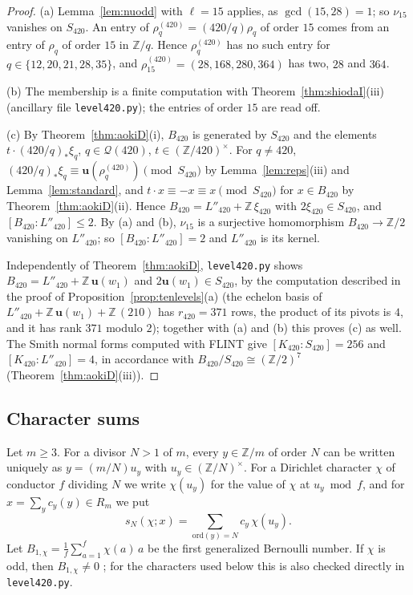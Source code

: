 \documentclass[11pt]{amsart}
\theoremstyle{definition}
\theoremstyle{remark}
\numberwithin{equation}{section}
\newcommand{\Z}{\mathbb{Z}}
\newcommand{\cQ}{\mathcal{Q}}
\newcommand{\uu}{\mathbf{u}}
\begin{document}
\begin{proof}
(a) Lemma~\ref{lem:nuodd} with $\ell=15$ applies, as $\gcd(15,28)=1$; so $\nu_{15}$ vanishes on $S_{420}$. An entry of $\rho^{(420)}_q=(420/q)\rho_q$ of order $15$ comes from an entry of $\rho_q$ of order $15$ in $\Z/q$. Hence $\rho^{(420)}_q$ has no such entry for $q\in\{12,20,21,28,35\}$, and $\rho^{(420)}_{15}=(28,168,280,364)$ has two, $28$ and $364$.

(b) The membership is a finite computation with Theorem~\ref{thm:shiodaI}(iii) (ancillary file \texttt{level420.py}); the entries of order $15$ are read off.

(c) By Theorem~\ref{thm:aokiD}(i), $B_{420}$ is generated by $S_{420}$ and the elements $t\cdot(420/q)_*\xi_q$, $q\in\cQ(420)$, $t\in(\Z/420)^\times$. For $q\ne420$, $(420/q)_*\xi_q\equiv\uu(\rho^{(420)}_q)\pmod{S_{420}}$ by Lemma~\ref{lem:reps}(iii) and Lemma~\ref{lem:standard}, and $t\cdot x\equiv-x\equiv x\pmod{S_{420}}$ for $x\in B_{420}$ by Theorem~\ref{thm:aokiD}(ii). Hence $B_{420}=L''_{420}+\Z\,\xi_{420}$ with $2\xi_{420}\in S_{420}$, and $[B_{420}:L''_{420}]\le2$. By (a) and (b), $\nu_{15}$ is a surjective homomorphism $B_{420}\to\Z/2$ vanishing on $L''_{420}$; so $[B_{420}:L''_{420}]=2$ and $L''_{420}$ is its kernel.

Independently of Theorem~\ref{thm:aokiD}, \texttt{level420.py} shows $B_{420}=L''_{420}+\Z\,\uu(w_1)$ and $2\uu(w_1)\in S_{420}$, by the computation described in the proof of Proposition~\ref{prop:tenlevels}(a) (the echelon basis of $L''_{420}+\Z\,\uu(w_1)+\Z\,(210)$ has $r_{420}=371$ rows, the product of its pivots is $4$, and it has rank $371$ modulo $2$); together with (a) and (b) this proves (c) as well. The Smith normal forms computed with FLINT give $[K_{420}:S_{420}]=256$ and $[K_{420}:L''_{420}]=4$, in accordance with $B_{420}/S_{420}\cong(\Z/2)^7$ (Theorem~\ref{thm:aokiD}(iii)).
\end{proof}

\subsection{Character sums}\label{subsec:charsums}
Let $m\ge3$. For a divisor $N>1$ of $m$, every $y\in\Z/m$ of order $N$ can be written uniquely as $y=(m/N)u_y$ with $u_y\in(\Z/N)^\times$. For a Dirichlet character $\chi$ of conductor $f$ dividing $N$ we write $\chi(u_y)$ for the value of $\chi$ at $u_y\bmod f$, and for $x=\sum_yc_y(y)\in R_m$ we put
\[
s_N(\chi;x)=\sum_{\mathrm{ord}(y)=N}c_y\,\chi(u_y).
\]
Let $B_{1,\chi}=\frac1f\sum_{a=1}^{f}\chi(a)\,a$ be the first generalized Bernoulli number. If $\chi$ is odd, then $B_{1,\chi}\ne0$ \cite[Chapter~4]{Wa97}; for the characters used below this is also checked directly in \texttt{level420.py}.
\end{document}
